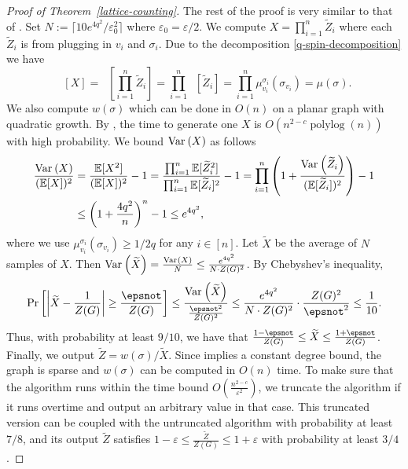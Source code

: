 \documentclass{theoretics}
\newcommand{\tp}[1]{{\left( #1 \right)}}
\newcommand{\Ex}{\mathop{\mathbb{{}E}}\nolimits}
\renewcommand{\Pr}{\mathop{\mathrm{Pr}}\nolimits}
\newcommand{\polylog}[1]{\ensuremath{\mathop{\mathrm{polylog}}\tp{#1}}}
\newcommand{\abs}[1]{\ensuremath{\left\vert#1\right\vert}}
\newcommand{\eps}{\varepsilon}
\newcommand{\Var}[2]{\ensuremath{\textnormal{Var}_{#1}\left(#2\right)}}
\newcommand{\defeq}{:=}
\begin{document}
\begin{proof}[Proof of Theorem~\ref{lattice-counting}]
  The rest of the proof is very similar to that of .
  Set $N\defeq\lceil10 e^{4q^2}/\eps_0^2\rceil$ where $\eps_0=\eps/2$. 
  We compute $X=\prod_{i=1}^n\widetilde{Z}_i$ where each $\widetilde{Z}_i$ is from  plugging in $v_i$ and $\sigma_i$. Due to the decomposition \eqref{q-spin-decomposition} we have
  \[\Ex[X]=\Ex\left[\prod_{i=1}^n\widetilde{Z}_i\right]=\prod_{i=1}^n\Ex\left[\widetilde{Z}_i\right]=\prod_{i=1}^n\mu_{v_i}^{\sigma_i}(\sigma_{v_i})=\mu(\sigma).\]
  We also compute $w(\sigma)$ which can be done in $O(n)$ on a planar graph with quadratic growth.
  By , the time to generate one $X$ is $O(n^{2-c}\polylog{n})$ with high probability. 
  We bound $\Var{}{X}$ as follows
  \begin{align*}
    \frac{\Var{}{X}}{(\Ex[X])^2}&=\frac{\Ex[X^2]}{(\Ex[X])^2}-1=\frac{\prod_{i=1}^n\Ex[\widetilde{Z}_i^2]}{\prod_{i=1}^n\Ex[\widetilde{Z}_i]^2}-1
    =\prod_{i=1}^n\left(1+\frac{\Var{}{\widetilde{Z}_i}}{(\Ex[\widetilde{Z}_i])^2}\right)-1\\
    &\leq\left(1+\frac{4q^2}{n}\right)^n-1\leq e^{4q^2},
  \end{align*}
  where we use $\mu_{v_i}^{\sigma_i}(\sigma_{v_i})\ge 1/2q$ for any $i\in[n]$.
  Let $\widetilde{X}$ be the average of $N$ samples of $X$. Then $\Var{}{\widetilde{X}}=\frac{\Var{}{X}}{N}\leq\frac{e^{4q^2}}{N\cdot Z(G)^2}$. 
  By Chebyshev's inequality,
  \begin{align*}
    \Pr\left[\abs{\widetilde{X}-\frac{1}{Z(G)}}\ge\frac{\epsnot}{Z(G)}\right]\le\frac{\Var{}{\widetilde{X}}}{\frac{\epsnot^2}{Z(G)^2}} 
    \le \frac{e^{4q^2}}{N\cdot Z(G)^2} \cdot \frac{Z(G)^2}{\epsnot^2}\le \frac{1}{10}.
  \end{align*}
  Thus, with probability at least $9/10$,
  we have that $\frac{1-\epsnot}{Z(G)}\le \widetilde{X} \le \frac{1+\epsnot}{Z(G)}$.
  Finally, we output $\widetilde{Z}=w(\sigma)/\widetilde{X}$.
  Since  implies a constant degree bound, the graph is sparse and $w(\sigma)$ can be computed in $O(n)$ time.
  To make sure that the algorithm runs within the time bound $O\left(\frac{n^{2-c}}{\eps^2}\right)$, 
  we truncate the algorithm if it runs overtime and output an arbitrary value in that case.
  This truncated version can be coupled with the untruncated algorithm with probability at least $7/8$,
  and its output $\widetilde{Z}$ satisfies $1-\eps\le \frac{\widetilde{Z}}{Z(G)}\le 1+\eps$ with probability at least $3/4$.
\end{proof}
\end{document}

